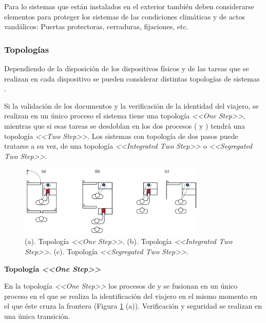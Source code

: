 Para lo sistemas que están instalados en el exterior también deben considerarse elementos para proteger los sistemas de las condiciones climáticas y de actos vandálicos: Puertas protectoras, cerraduras, fijaciones, etc.


\subsubsection{Topologías}\label{subsec:Topologias}

Dependiendo de la disposición de los dispositivos físicos y de las tareas que se realizan en cada dispositivo se pueden considerar distintas topologías de sistemas .

Si la validación de los documentos y la verificación de la identidad del viajero, se realizan en un único proceso el sistema tiene una topología \textit{<<One Step>>}, mientras que si esas tareas se desdoblan en los dos procesos ( y ) tendrá una topología \textit{<<Two Step>>}. Los sistemas  con topología de dos pasos puede tratarse a su vez, de una topología \textit{<<Integrated Two Step>>} o \textit{<<Segregated Two Step>>}.    

\begin{figure}
    \centering
    \includegraphics[width=0.8\textwidth]{ch-sistemasABC/images/ch-SistemasABC/topologiasABC.png}
    \caption{(a). Topología  \textit{<<One Step>>}. (b). Topología  \textit{<<Integrated Two Step>>}. (c). Topología  \textit{<<Segregated Two Step>>}. \cite{FRONTEX2016OpeReport}}
    \label{fig:TopologiasABC}
\end{figure}

\medskip
\textbf{Topología \textit{<<One Step>>}}
\medskip

En la topología \textit{<<One Step>>} los procesos de  y  se fusionan en un único proceso en el que se realiza la identificación del viajero en el mismo momento en el que éste cruza la frontera (Figura \ref{fig:TopologiasABC} (a)). Verificación y seguridad se realizan en una única transición. 

